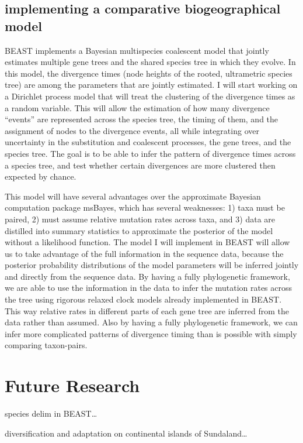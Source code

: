 \documentclass[10pt]{article}
\begin{document}
\subsection*{implementing a comparative biogeographical model}
BEAST implements a Bayesian multispecies coalescent model that jointly estimates multiple gene trees and the shared species tree in which they evolve.
In this model, the divergence times (node heights of the rooted, ultrametric species tree) are among the parameters that are jointly estimated.
I will start working on a Dirichlet process model that will treat the clustering of the divergence times as a random variable.
This will allow the estimation of how many divergence ``events'' are represented across the species tree, the timing of them, and the assignment of nodes to the divergence events, all while integrating over uncertainty in the substitution and coalescent processes, the gene trees, and the species tree.
The goal is to be able to infer the pattern of divergence times across a species tree, and test whether certain divergences are more clustered then expected by chance.

This model will have several advantages over the approximate Bayesian computation package msBayes, which has several weaknesses:
1) taxa must be paired, 
2) must assume relative mutation rates across taxa, and 
3) data are distilled into summary statistics to approximate the posterior of the model without a likelihood function.
The model I will implement in BEAST will allow us to take advantage of the full information in the sequence data, because the posterior probability distributions of the model parameters will be inferred jointly and directly from the sequence data.
By having a fully phylogenetic framework, we are able to use the information in the data to infer the mutation rates across the tree using rigorous relaxed clock models already implemented in BEAST.
This way relative rates in different parts of each gene tree are inferred from the data rather than assumed.
Also by having a fully phylogenetic framework, we can infer more complicated patterns of divergence timing than is possible with simply comparing taxon-pairs.

\section*{Future Research}
species delim in BEAST\ldots

diversification and adaptation on continental islands of Sundaland\ldots
\end{document}
